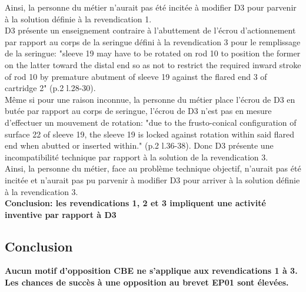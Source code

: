 Ainsi, la personne du métier n'aurait pas été incitée à modifier D3 pour parvenir à la solution
définie à la revendication 1.\\

D3 présente un enseignement contraire à l'abuttement de l'écrou d'actionnement par rapport au corps
de la seringue défini à la revendication 3 pour le remplissage de la seringue:
"sleeve 19 may have to be rotated on rod 10 to position the former
on the latter toward the distal end so as not to restrict the required inward stroke of
rod 10 by premature abutment of sleeve 19 against the flared end 3 of cartridge 2" (p.2 l.28-30).\\

Même si pour une raison inconnue, la personne du métier place l'écrou de D3 en butée par rapport au corps
de seringue, l'écrou de D3 n'est pas en mesure d'effectuer un mouvement de rotation:
"due to the frusto-conical configuration of surface 22 of sleeve 19, the sleeve 19 is locked against
rotation within said flared end when abutted or inserted within." (p.2 l.36-38). Donc D3 présente
une incompatibilité technique par rapport à la solution de la revendication 3.\\

Ainsi, la personne du métier, face au problème technique objectif,
n'aurait pas été incitée et n'aurait pas pu parvenir à modifier D3 pour 
arriver à la solution définie à la revendication 3.\\

\textbf{Conclusion: les revendications 1, 2 et 3 impliquent une activité inventive par rapport à D3}\\

\subsection{Conclusion}

\textbf{Aucun motif d'opposition  CBE ne s'applique aux revendications 1 à 3. Les chances de succès
à une opposition au brevet EP01 sont élevées.}